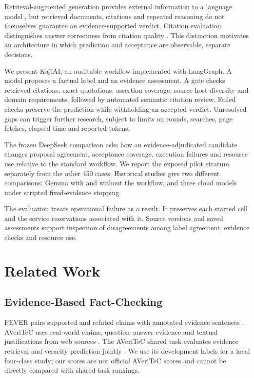 \documentclass[conference]{IEEEtran}
\begin{document}
Retrieval-augmented generation provides external information to a language model \cite{rag}, but retrieved documents, citations and repeated reasoning do not themselves guarantee an evidence-supported verdict. Citation evaluation distinguishes answer correctness from citation quality \cite{alce}. This distinction motivates an architecture in which prediction and acceptance are observable, separate decisions.

We present KajiAI, an auditable workflow implemented with LangGraph. A model proposes a factual label and an evidence assessment. A gate checks retrieved citations, exact quotations, assertion coverage, source-host diversity and domain requirements, followed by automated semantic citation review. Failed checks preserve the prediction while withholding an accepted verdict. Unresolved gaps can trigger further research, subject to limits on rounds, searches, page fetches, elapsed time and reported tokens.

The frozen DeepSeek comparison asks how an evidence-adjudicated candidate changes proposal agreement, acceptance coverage, execution failures and resource use relative to the standard workflow. We report the exposed pilot stratum separately from the other 450 cases. Historical studies give two different comparisons: Gemma with and without the workflow, and three cloud models under scripted fixed-evidence stopping.

The evaluation treats operational failure as a result. It preserves each started cell and the service reservations associated with it. Source versions and saved assessments support inspection of disagreements among label agreement, evidence checks and resource use.

\section{Related Work}
\subsection{Evidence-Based Fact-Checking}
FEVER pairs supported and refuted claims with annotated evidence sentences \cite{fever}. AVeriTeC uses real-world claims, question--answer evidence and textual justifications from web sources \cite{averitec}. The AVeriTeC shared task evaluates evidence retrieval and veracity prediction jointly \cite{sharedtask}. We use its development labels for a local four-class study; our scores are not official AVeriTeC scores and cannot be directly compared with shared-task rankings.
\end{document}
